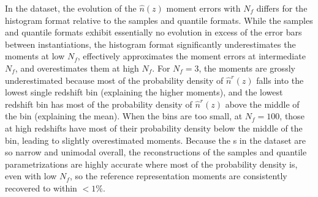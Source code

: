 In the \mgdata dataset, the evolution of the $\hat{n}(z)$ moment errors with 
$N_{f}$ differs for the histogram format relative to the samples and quantile 
formats.
While the samples and quantile formats exhibit essentially no evolution in 
excess of the error bars between instantiations, the histogram format 
significantly underestimates the moments at low $N_{f}$, effectively 
approximates the moment errors at intermediate $N_{f}$, and overestimates them 
at high $N_{f}$.
For $N_{f}=3$, the moments are grossly underestimated because most of the 
probability density of $\hat{n}^{r}(z)$ falls into the lowest single redshift 
bin (explaining the higher moments), and the lowest redshift bin has most of 
the probability density of $\hat{n}^{r}(z)$ above the middle of the bin 
(explaining the mean).
When the bins are too small, at $N_{f}=100$, those at high redshifts have most 
of their probability density below the middle of the bin, leading to slightly 
overestimated moments.
Because the \pz s in the \mgdata dataset are so narrow and unimodal overall, 
the reconstructions of the samples and quantile parametrizations are highly 
accurate where most of the probability density is, even with low $N_{f}$, so 
the reference representation moments are consistently recovered to within 
$<1\%$.

